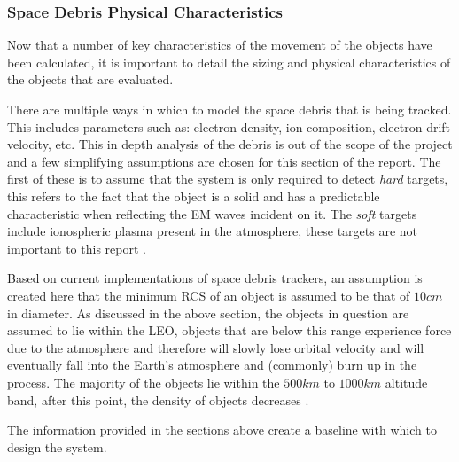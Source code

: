 \documentclass[11pt]{witseiepaper}
\begin{document}
\subsubsection{Space Debris Physical Characteristics} \label{sec:SpaceDebrisPhysicalCharacteristics}
Now that a number of key characteristics of the movement of the objects have been calculated, it is important to detail the sizing and physical characteristics of the objects that are evaluated.

There are multiple ways in which to model the space debris that is being tracked. This includes parameters such as: electron density, ion composition, electron drift velocity, etc. This in depth analysis of the debris is out of the scope of the project and a few simplifying assumptions are chosen for this section of the report.
The first of these is to assume that the system is only required to detect \textit{hard} targets, this refers to the fact that the object is a solid and has a predictable characteristic when reflecting the EM waves incident on it. The \textit{soft} targets include ionospheric plasma present in the atmosphere, these targets are not important to this report \cite{softTarget}.  

Based on current implementations of space debris trackers, an assumption is created here that the minimum RCS of an object is assumed to be that of $10 cm$ in diameter.
As discussed in the above section, the objects in question are assumed to lie within the LEO, objects that are below this range experience force due to the atmosphere and therefore will slowly lose orbital velocity and will eventually fall into the Earth's atmosphere and (commonly) burn up in the process.
The majority of the objects lie within the $500 km$ to $1000 km$ altitude band, after this point, the density of objects decreases \cite{ObjectInformation}. 

The information provided in the sections above create a baseline with which to design the system.



\end{document}
